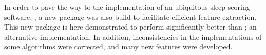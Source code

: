 In order to pave the way to the implementation of an ubiquitous sleep scoring software.
\pr, a new \py{} package was also build to facilitate efficient feature extraction.
This new package is here demonstrated to perform significantly better than \pyeeg{}\cite{bao_pyeeg:_2011}; an alternative implementation.
In addition, inconsistencies in the implementations of some algorithms were corrected, and many new features were developed.
